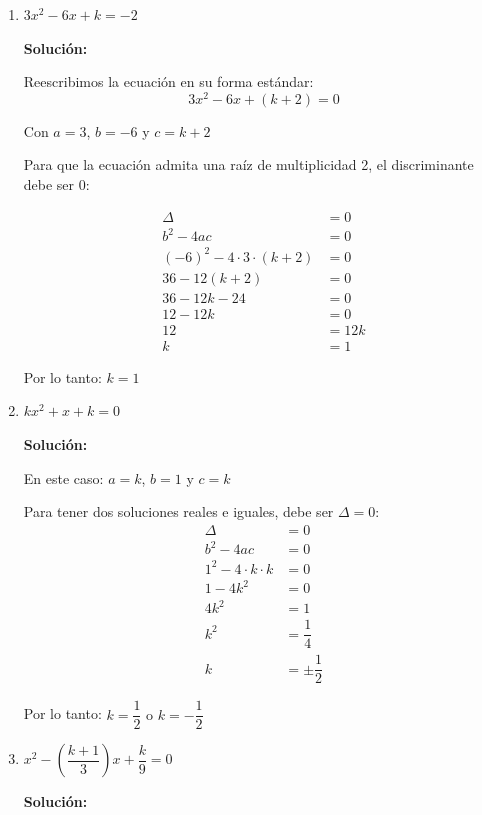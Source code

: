 \documentclass[12pt]{article}
\newcommand{\solucion}{%
    \vspace{0.8em}%
    \textbf{Solución:}%
}
\begin{document}
\begin{enumerate}[label=\alph*.-]
\item $3x^2 - 6x + k = -2$

\solucion

Reescribimos la ecuación en su forma estándar:
\[
3x^2 - 6x + (k+2) = 0
\]

Con $a = 3$, $b = -6$ y $c = k+2$

Para que la ecuación admita una raíz de multiplicidad 2, el discriminante debe ser 0:

\begin{align*}
\Delta &= 0 \\[0.3em]
b^2 - 4ac &= 0 \\[0.3em]
(-6)^2 - 4 \cdot 3 \cdot (k+2) &= 0 \\[0.3em]
36 - 12(k+2) &= 0 \\[0.3em]
36 - 12k - 24 &= 0 \\[0.3em]
12 - 12k &= 0 \\[0.3em]
12 &= 12k \\[0.3em]
k &= 1
\end{align*}

Por lo tanto: $\boxed{k = 1}$

\newpage
\item $kx^2 + x + k = 0$

\solucion

En este caso: $a = k$, $b = 1$ y $c = k$

Para tener dos soluciones reales e iguales, debe ser $\Delta = 0$:
\begin{align*}
\Delta &= 0 \\[0.3em]
b^2 - 4ac &= 0 \\[0.3em]
1^2 - 4 \cdot k \cdot k &= 0 \\[0.3em]
1 - 4k^2 &= 0 \\[0.3em]
4k^2 &= 1 \\[0.3em]
k^2 &= \dfrac{1}{4} \\[0.3em]
k &= \pm \dfrac{1}{2}
\end{align*}

Por lo tanto: $\boxed{k = \dfrac{1}{2} \text{ o } k = -\dfrac{1}{2}}$

\newpage
\item $x^2 - \left(\dfrac{k+1}{3}\right)x + \dfrac{k}{9} = 0$

\solucion


\end{enumerate}
\end{document}
